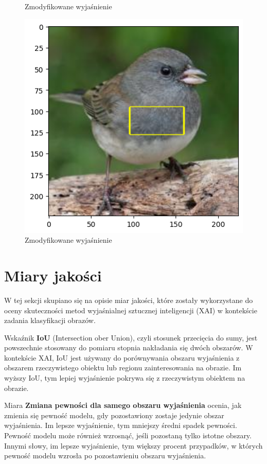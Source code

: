 \begin{figure}
\begin{minipage}[b]{0.3\textwidth}
		\caption{Zmodyfikowane wyjaśnienie}  \label{rys:parameters_lime_numsamples_1000}
	\end{minipage}
	\begin{minipage}[b]{0.3\textwidth}
		\centering\includegraphics[width=.9\textwidth]{img/parameters/gradcam/threshold_09}
		\caption{Zmodyfikowane wyjaśnienie}  \label{rys:parameters_lime_numsamples_1000}
	\end{minipage}
\end{figure}

\section*{Miary jakości}

W tej sekcji skupiano się na opisie miar jakości, które zostały wykorzystane do oceny skuteczności metod wyjaśnialnej sztucznej inteligencji (XAI) w kontekście zadania klasyfikacji obrazów.

Wskaźnik \textbf{IoU} (Intersection ober Union), czyli stosunek przecięcia do sumy, jest powszechnie stosowany do pomiaru stopnia nakładania się dwóch obszarów.
W kontekście XAI, IoU jest używany do porównywania obszaru wyjaśnienia z obszarem rzeczywistego obiektu lub regionu zainteresowania na obrazie.
Im wyższy IoU, tym lepiej wyjaśnienie pokrywa się z rzeczywistym obiektem na obrazie.

Miara \textbf{Zmiana pewności dla samego obszaru wyjaśnienia} ocenia, jak zmienia się pewność modelu, gdy pozostawiony zostaje jedynie obszar wyjaśnienia.
Im lepsze wyjaśnienie, tym mniejszy średni spadek pewności. Pewność modelu może również wzrosnąć, jeśli pozostaną tylko istotne obszary.
Innymi słowy, im lepsze wyjaśnienie, tym większy procent przypadków, w których pewność modelu wzrosła po pozostawieniu obszaru wyjaśnienia.

